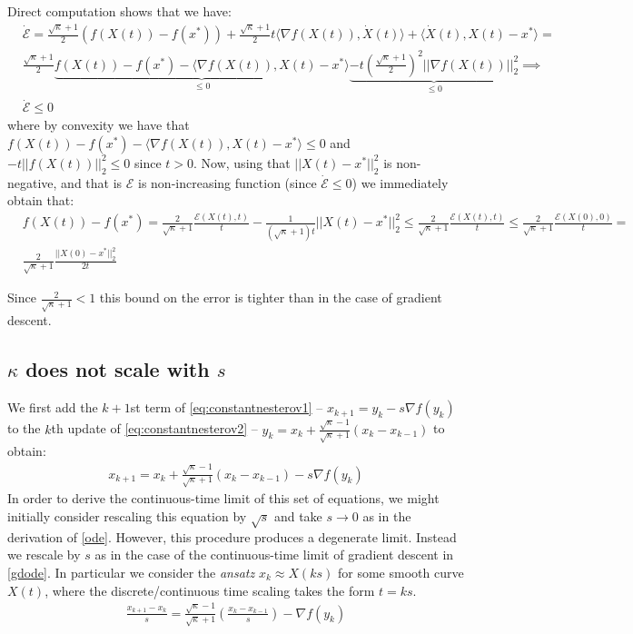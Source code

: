 Direct computation shows that we have:
\begin{align*}
    & \dot{\mathcal{E}}= \frac{\sqrt{\kappa}+1}{2}(f(X(t)) - f(x^*)) + \frac{\sqrt{\kappa}+1}{2} t \langle \nabla f(X(t)), \dot{X}(t) \rangle + \langle \dot{X}(t), X(t)-x^* \rangle = \\
    & \frac{\sqrt{\kappa}+1}{2} \underbrace{f(X(t)) - f(x^*) - \langle \nabla f(X(t)), X(t) - x^* \rangle}_{\leq 0} \underbrace{- t (\frac{\sqrt{\kappa}+1}{2})^2 || \nabla f(X(t))||_2^2}_{\leq 0} \implies \\
    & \dot{\mathcal{E}} \leq 0
\end{align*}
where by convexity we have that $f(X(t)) - f(x^*) - \langle \nabla f(X(t)), X(t) - x^* \rangle \leq 0$ and $ - t ||f(X(t))||_2^2 \leq 0$ since $t>0$. Now, using that $||X(t)-x^*||_2^2$ is non-negative, and that is $\mathcal{E}$ is non-increasing function (since $\dot{\mathcal{E}} \leq 0$) we immediately obtain that:
\begin{align*}
    & f(X(t)) - f(x^*) = \frac{2}{\sqrt{\kappa}+1} \frac{\mathcal{E}(X(t), t)}{t} - \frac{1}{(\sqrt{\kappa}+1)t} ||X(t) - x^*||_2^2 \leq \frac{2}{\sqrt{\kappa}+1} \frac{\mathcal{E}(X(t), t)}{t} \leq \frac{2}{\sqrt{\kappa}+1} \frac{\mathcal{E}(X(0), 0)}{t} = \\ & \frac{2}{\sqrt{\kappa}+1} \frac{||X(0)-x^*||_2^2}{2t}
\end{align*}

Since $\frac{2}{\sqrt{\kappa}+1} < 1$ this bound on the error is tighter than in the case of gradient descent.

 
 
 
 \subsection{$\kappa$ does not scale with $s$}

 
 We first add the $k+1$st term of \eqref{eq:constantnesterov1} -- $x_{k+1} = y_k - s \nabla f(y_k)$ to the $k$th update of \eqref{eq:constantnesterov2} -- $y_k = x_k + \frac{\sqrt{\kappa}-1}{\sqrt{\kappa}+1} (x_k - x_{k-1})$ to obtain:
 \begin{align*}
     x_{k+1} = x_{k} + \frac{\sqrt{\kappa}-1}{\sqrt{\kappa}+1}(x_{k}-x_{k-1}) - s \nabla f(y_k)
 \end{align*}
 In order to derive the continuous-time limit of this set of equations, we might initially consider rescaling this equation by $\sqrt{s}$ and take $s \to 0$ as in the derivation of \eqref{ode}. However, this procedure produces a degenerate limit. Instead we rescale by $s$ as in the case of the continuous-time limit of gradient descent in \eqref{gdode}. In particular we consider the \textit{ansatz} $x_k \approx X(k s)$ for some smooth curve $X(t)$, where the discrete/continuous time scaling takes the form $t = k s$.
 \begin{align*}
    \frac{x_{k+1}-x_k}{s} = \frac{\sqrt{\kappa}-1}{\sqrt{\kappa}+1} \left( \frac{x_{k}-x_{k-1}}{s} \right) - \nabla f(y_k)
 \end{align*}
 

